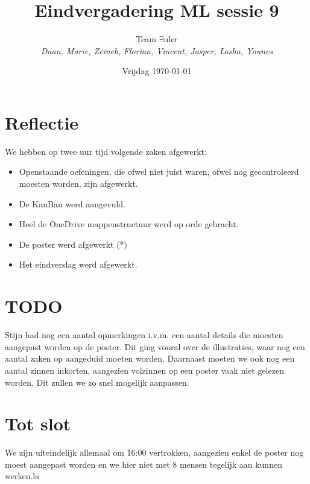 \documentclass{article}
\title{Eindvergadering ML sessie 9}
\author{Team $\exists$uler\\
	\textit{Daan, Marie, Zeineb, Florian, Vincent, Jasper, Lasha, Younes}}
\date{Vrijdag \today}
\begin{document}
	
\maketitle

\section*{Reflectie}

We hebben op twee uur tijd volgende zaken afgewerkt:

\begin{itemize}
	\item Openstaande oefeningen, die ofwel niet juist waren, ofwel nog gecontroleerd moesten worden, zijn afgewerkt.
	\item De KanBan werd aangevuld.
	\item Heel de OneDrive mappenstructuur werd op orde gebracht.
	\item De poster werd afgewerkt (*)
	\item Het eindverslag werd afgewerkt.
\end{itemize}

\section*{TODO}
Stijn had nog een aantal opmerkingen i.v.m. een aantal details die moesten aangepast worden op de poster. Dit ging vooral over de illustraties, waar nog een aantal zaken op aangeduid moeten worden. Daarnaast moeten we ook nog een aantal zinnen inkorten, aangezien volzinnen op een poster vaak niet gelezen worden. Dit zullen we zo snel mogelijk aanpassen.

\section*{Tot slot}
We zijn uiteindelijk allemaal om 16:00 vertrokken, aangezien enkel de poster nog moest aangepast worden en we hier niet met 8 mensen tegelijk aan kunnen werken.la
\end{document}
